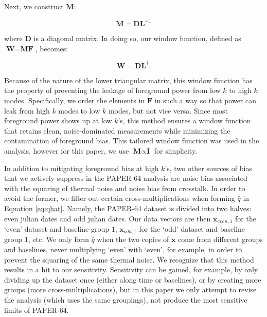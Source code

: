 \documentclass[preprint2,numberedappendix,tighten]{aastex6}  %
\begin{document}
\noindent Next, we construct $\textbf{M}$:

\begin{equation}
\textbf{M} = \textbf{DL}^{-1}
\end{equation}

\noindent where $\textbf{D}$ is a diagonal matrix. In doing so, our window function, defined as $\textbf{W} = \textbf{MF}$, 
becomes:

\begin{equation}
\textbf{W} = \textbf{DL}^{\dagger}.
\end{equation}

\noindent Because of the nature of the lower triangular matrix, this window function has the property of preventing the leakage 
of foreground power from low $k$ to high $k$ modes. Specifically, we order the elements in $\textbf{F}$ in such a way so that 
power can leak from high $k$ modes to low $k$ modes, but not vice versa. Since most foreground power shows up at low 
$k$'s, this method ensures a window function that retains clean, noise-dominated measurements while minimizing the 
contamination of foreground bias. This tailored window function was used in the  analysis, however for this paper, we use $\textbf{M} \propto \textbf{I}$ for simplicity.

In addition to mitigating foreground bias at high $k$'s, two other sources of bias that we actively suppress in the PAPER-64 
analysis are noise bias associated with the squaring of thermal noise and noise bias from crosstalk. In order to avoid the 
former, we filter out certain cross-multiplications when forming $\widehat{q}$ in Equation \eqref{eq:qhat}. Namely, the PAPER-64 
dataset is divided into two halves: even julian dates and odd julian dates. Our data vectors are then $\textbf{x}_{even, 1}$ for 
the `even' dataset and baseline group $1$, $\textbf{x}_{odd, 1}$ for the `odd' dataset and baseline group $1$, etc. We only form 
$\widehat{q}$ when the two copies of $\textbf{x}$ come from different groups and baselines, never multiplying `even' with `even', for 
example, in order to prevent the squaring of the same thermal noise. We recognize that this method results in a hit to our sensitivity. Sensitivity can be gained, for example, by only dividing up the dataset once (either along time or baselines), or by creating more groups (more cross-multiplications), but in this paper we only attempt to revise the  analysis (which uses the same groupings), not produce the most sensitive limits of PAPER-64.
\end{document}
